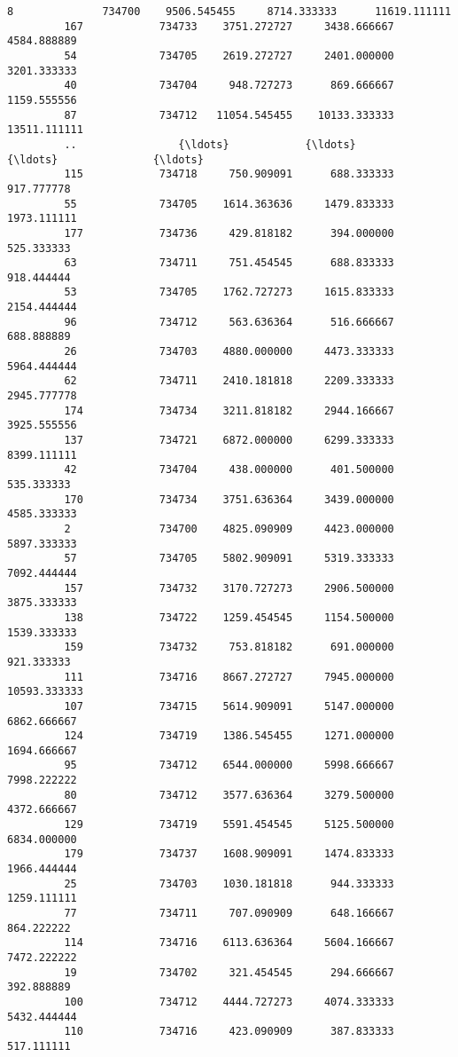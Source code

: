 \documentclass[11pt]{article}
\begin{document}
\begin{Verbatim}[commandchars=\\\{\}]
         8              734700    9506.545455     8714.333333      11619.111111   
         167            734733    3751.272727     3438.666667       4584.888889   
         54             734705    2619.272727     2401.000000       3201.333333   
         40             734704     948.727273      869.666667       1159.555556   
         87             734712   11054.545455    10133.333333      13511.111111   
         ..                {\ldots}            {\ldots}             {\ldots}               {\ldots}   
         115            734718     750.909091      688.333333        917.777778   
         55             734705    1614.363636     1479.833333       1973.111111   
         177            734736     429.818182      394.000000        525.333333   
         63             734711     751.454545      688.833333        918.444444   
         53             734705    1762.727273     1615.833333       2154.444444   
         96             734712     563.636364      516.666667        688.888889   
         26             734703    4880.000000     4473.333333       5964.444444   
         62             734711    2410.181818     2209.333333       2945.777778   
         174            734734    3211.818182     2944.166667       3925.555556   
         137            734721    6872.000000     6299.333333       8399.111111   
         42             734704     438.000000      401.500000        535.333333   
         170            734734    3751.636364     3439.000000       4585.333333   
         2              734700    4825.090909     4423.000000       5897.333333   
         57             734705    5802.909091     5319.333333       7092.444444   
         157            734732    3170.727273     2906.500000       3875.333333   
         138            734722    1259.454545     1154.500000       1539.333333   
         159            734732     753.818182      691.000000        921.333333   
         111            734716    8667.272727     7945.000000      10593.333333   
         107            734715    5614.909091     5147.000000       6862.666667   
         124            734719    1386.545455     1271.000000       1694.666667   
         95             734712    6544.000000     5998.666667       7998.222222   
         80             734712    3577.636364     3279.500000       4372.666667   
         129            734719    5591.454545     5125.500000       6834.000000   
         179            734737    1608.909091     1474.833333       1966.444444   
         25             734703    1030.181818      944.333333       1259.111111   
         77             734711     707.090909      648.166667        864.222222   
         114            734716    6113.636364     5604.166667       7472.222222   
         19             734702     321.454545      294.666667        392.888889   
         100            734712    4444.727273     4074.333333       5432.444444   
         110            734716     423.090909      387.833333        517.111111   
         

\end{Verbatim}
\end{document}
